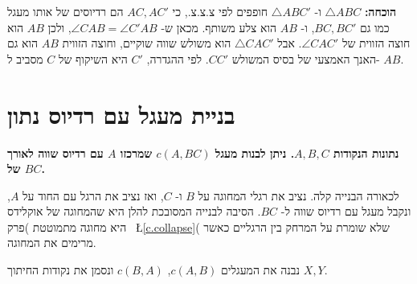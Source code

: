 \vspace{-1ex}

\textbf{הוכחה:}
$\triangle ABC$
ו-%
$\triangle ABC'$
חופפים לפי צ.צ.צ., כי
$AC,AC'$
הם רדיוסים של אותו מעגל כמו גם
$BC,BC'$,
ו-%
$AB$
הוא צלע משותף. מכאן ש-%
$\angle CAB = \angle C'AB$,
ולכן
$AB$
הוא חוצה הזווית של
$\angle CAC'$.
אבל
$\triangle CAC'$
הוא משולש שווה שוקיים, וחוצה הזווית
$AB$
הוא גם האנך האמצעי של בסיס המשולש
$CC'$.
לפי ההגדרה,
$C'$
היא השיקוף של
$C$
מסביב ל-%
$AB$.

\vspace{-2ex}


\section{%
בניית מעגל עם רדיוס נתון
}\label{s.radius}

\textbf{%
נתונות הנקודות
$A,B,C$.
ניתן לבנות מעגל
$c(A,BC)$
שמרכזו 
$A$
עם רדיוס שווה לאורך של 
$BC$.
}

לכאורה הבנייה קלה. נציב את רגלי המחוגה על
$B$
ו-%
$C$,
ואז נציב את הרגל עם החוד על
$A$,
ונקבל מעגל עם רדיוס שווה ל-%
$BC$.
הסיבה לבנייה המסובכת להלן היא שהמחוגה של אוקלידס היא מחוגה מתמוטטת )פרק~%
\L{\ref{c.collapse}}(
שלא שומרת על המרחק בין הרגליים כאשר מרימים את המחוגה.

נבנה את המעגלים 
$c(A,B)$, $c(B,A)$
ונסמן את נקודות החיתוך
$X,Y$.

\begin{center}

\end{center}

\np


